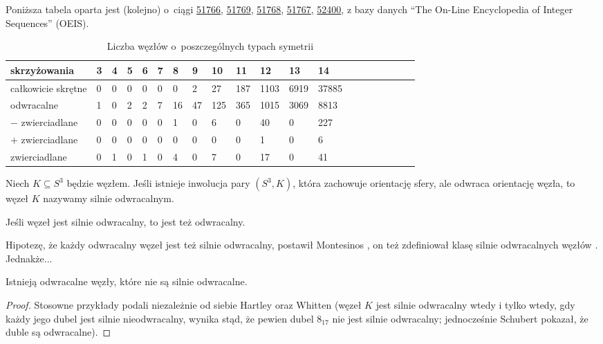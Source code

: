 Poniższa tabela oparta jest (kolejno) o~ciągi
\href{https://oeis.org/A051766}{51766},
\href{https://oeis.org/A051769}{51769},
\href{https://oeis.org/A051768}{51768},
\href{https://oeis.org/A051767}{51767},
\href{https://oeis.org/A052400}{52400},
z bazy danych ``The On-Line Encyclopedia of Integer Sequences'' (OEIS).

\begin{table}[h]
    \centering
    \begin{tabular}{@{}*{20}l@{}} \toprule
        skrzyżowania & 3 & 4 & 5 & 6 & 7 & 8 & 9 & 10 & 11 & 12 & 13 & 14 \\ \midrule
        całkowicie skrętne & 0 & 0 & 0 & 0 & 0 & 0 & 2 & 27 & 187 & 1103 & 6919 & 37885 \\
        odwracalne & 1 & 0 & 2 & 2 & 7 & 16 & 47 & 125 & 365 & 1015 & 3069 & 8813 \\
        $-$ zwierciadlane & 0 & 0 & 0 & 0 & 0 & 1 & 0 & 6 & 0 & 40 & 0 & 227 \\
        $+$ zwierciadlane & 0 & 0 & 0 & 0 & 0 & 0 & 0 & 0 & 0 & 1 & 0 & 6 \\
        zwierciadlane & 0 & 1 & 0 & 1 & 0 & 4 & 0 & 7 & 0 & 17 & 0 & 41 \\
        \bottomrule
        \hline
    \end{tabular}
    \caption{Liczba węzłów o~poszczególnych typach symetrii}
\end{table}

\begin{definition}
    Niech $K \subseteq S^3$ będzie węzłem.
    Jeśli istnieje inwolucja pary $(S^3, K)$, która zachowuje orientację sfery, ale odwraca orientację węzła, to węzeł $K$ nazywamy silnie odwracalnym.
\end{definition}

\begin{proposition}
    Jeśli węzeł jest silnie odwracalny, to jest też odwracalny.
\end{proposition}

Hipotezę, że każdy odwracalny węzeł jest też silnie odwracalny, postawił Montesinos \cite[problem 1.6]{kirby78}, on też zdefiniował klasę silnie odwracalnych węzłów \cite{montesinos75}.
%
Jednakże...

\begin{proposition}
    Istnieją odwracalne węzły, które nie są silnie odwracalne.
\end{proposition}

\begin{proof}
%
%
    Stosowne przykłady podali niezależnie od siebie Hartley \cite[s. 183]{hartley80} oraz Whitten \cite{whitten81} (węzeł $K$ jest silnie odwracalny wtedy i tylko wtedy, gdy każdy jego dubel jest silnie nieodwracalny, wynika stąd, że pewien dubel $8_{17}$ nie jest silnie odwracalny; jednocześnie Schubert \cite[s. 235]{schubert53} pokazał, że duble są odwracalne).
\end{proof}


